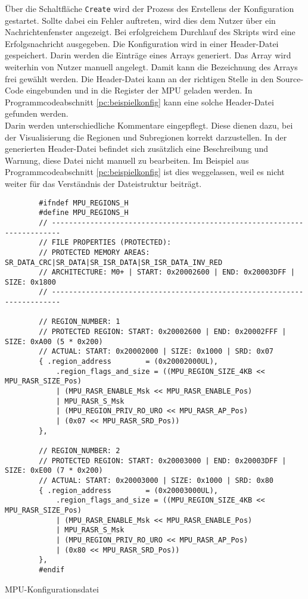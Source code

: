 Über die Schaltfläche \verb*|Create| wird der Prozess des Erstellens der Konfiguration gestartet.
Sollte dabei ein Fehler auftreten, wird dies dem Nutzer über ein Nachrichtenfenster angezeigt.
Bei erfolgreichem Durchlauf des Skripts wird eine Erfolgsnachricht ausgegeben.
Die Konfiguration wird in einer Header-Datei gespeichert.
Darin werden die Einträge eines Arrays generiert.
Das Array wird weiterhin von Nutzer manuell angelegt.
Damit kann die Bezeichnung des Arrays frei gewählt werden.
Die Header-Datei kann an der richtigen Stelle in den Source-Code eingebunden und in die Register der \ac{MPU} geladen werden.
In Programmcodeabschnitt \ref{pc:beispielkonfig} kann eine solche Header-Datei gefunden werden. \\

Darin werden unterschiedliche Kommentare eingepflegt.
Diese dienen dazu, bei der Visualisierung die Regionen und Subregionen korrekt darzustellen.
In der generierten Header-Datei befindet sich zusätzlich eine Beschreibung und Warnung, diese Datei nicht manuell zu bearbeiten.
Im Beispiel aus Programmcodeabschnitt \ref{pc:beispielkonfig} ist dies weggelassen, weil es nicht weiter für das Verständnis der Dateistruktur beiträgt.

\begin{listing}[H]
	\begin{verbatim}
		#ifndef MPU_REGIONS_H
		#define MPU_REGIONS_H
		// ------------------------------------------------------------------------
		// FILE PROPERTIES (PROTECTED):
		// PROTECTED MEMORY AREAS: SR_DATA_CRC|SR_DATA|SR_ISR_DATA|SR_ISR_DATA_INV_RED
		// ARCHITECTURE: M0+ | START: 0x20002600 | END: 0x20003DFF |  SIZE: 0x1800
		// ------------------------------------------------------------------------
		
		// REGION_NUMBER: 1
		// PROTECTED REGION: START: 0x20002600 | END: 0x20002FFF | SIZE: 0xA00 (5 * 0x200)
		// ACTUAL: START: 0x20002000 | SIZE: 0x1000 | SRD: 0x07
		{ .region_address        = (0x20002000UL),
			.region_flags_and_size = ((MPU_REGION_SIZE_4KB << MPU_RASR_SIZE_Pos)
			| (MPU_RASR_ENABLE_Msk << MPU_RASR_ENABLE_Pos)
			| MPU_RASR_S_Msk
			| (MPU_REGION_PRIV_RO_URO << MPU_RASR_AP_Pos)
			| (0x07 << MPU_RASR_SRD_Pos))
		},
		
		// REGION_NUMBER: 2
		// PROTECTED REGION: START: 0x20003000 | END: 0x20003DFF | SIZE: 0xE00 (7 * 0x200)
		// ACTUAL: START: 0x20003000 | SIZE: 0x1000 | SRD: 0x80
		{ .region_address        = (0x20003000UL),
			.region_flags_and_size = ((MPU_REGION_SIZE_4KB << MPU_RASR_SIZE_Pos)
			| (MPU_RASR_ENABLE_Msk << MPU_RASR_ENABLE_Pos)
			| MPU_RASR_S_Msk
			| (MPU_REGION_PRIV_RO_URO << MPU_RASR_AP_Pos)
			| (0x80 << MPU_RASR_SRD_Pos))
		},
		#endif
	\end{verbatim}
	\caption{MPU-Konfigurationsdatei}
	\label{pc:beispielkonfig}
\end{listing}

